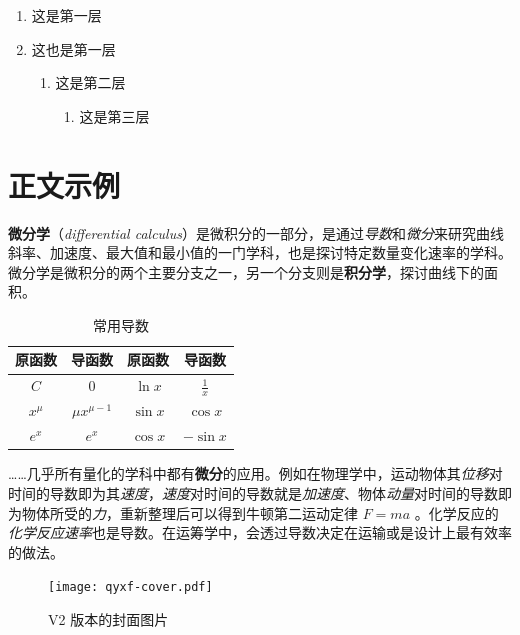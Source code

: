 \documentclass[
  10pt,
  twoside,
  openany,
  b5paper, %
  colorscheme = bootstrap-v4, %
]{qyxf-book}
\numberwithin{equation}{section}
\begin{document}
\begin{enumerate}
  \item 这是第一层
  \item 这也是第一层
  \begin{enumerate}
    \item 这是第二层
    \begin{enumerate}
      \item 这是第三层
    \end{enumerate}
  \end{enumerate}
\end{enumerate}

\section{正文示例}

\textbf{微分学}（\emph{differential calculus}）是微积分的一部分，是通过\emph{导数}和\emph{微分}来研究曲线斜率、加速度、最大值和最小值的一门学科，也是探讨特定数量变化速率的学科。微分学是微积分的两个主要分支之一，另一个分支则是\textbf{积分学}，探讨曲线下的面积。


\begin{table}[htbp]
  \centering
  \caption{常用导数}
  \begin{tabular}{cccc}
    \toprule
    \textbf{原函数} & \textbf{导函数}   & \textbf{原函数} & \textbf{导函数} \\
    \midrule
    $C$             & $0$               & $\ln x$         & $\frac{1}{x}$   \\
    $x^\mu$         & $\mu x^{\mu - 1}$ & $\sin x$        & $\cos x$        \\
    $e^x$           & $e^x$             & $\cos x$        & $-\sin x$       \\
    \bottomrule
  \end{tabular}
\end{table}

……几乎所有量化的学科中都有\textbf{微分}的应用。例如在物理学中，运动物体其\emph{位移}对时间的导数即为其\emph{速度}，\emph{速度}对时间的导数就是\emph{加速度}、物体\emph{动量}对时间的导数即为物体所受的\emph{力}，重新整理后可以得到牛顿第二运动定律 $F=ma$ 。化学反应的\emph{化学反应速率}也是导数。在运筹学中，会透过导数决定在运输或是设计上最有效率的做法。

\begin{figure}[htbp]
  \centering
  \texttt{[image: qyxf-cover.pdf]}
  \caption{V2 版本的封面图片}
  \label{fig:qyxf-logo}
\end{figure}
\end{document}
